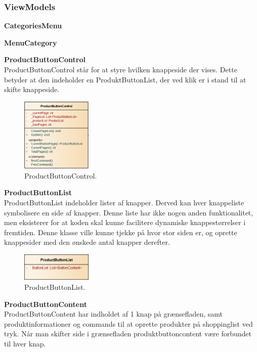 \subsubsection{ViewModels}
\textbf{CategoriesMenu}


\textbf{MenuCategory}

\textbf{ProductButtonControl} \\
ProductButtonControl står for at styre hvilken knappeside der vises. Dette betyder at den indeholder en ProduktButtonList, der ved klik er i stand til at skifte knappeside.

\begin{figure}[H]
	\centering
	\includegraphics[width=0.3\textwidth]{Systemdesign/Frontend/pics/ProductButtonControl}
	\caption{ProductButtonControl.}
	\label{fig:PBC}
\end{figure}

\textbf{ProductButtonList} \\
ProductButtonList indeholder lister af knapper. Derved kan hver knappeliste symbolisere en side af knapper. Denne liste har ikke nogen anden funktionalitet, men eksisterer for at koden skal kunne facilitere dynamiske knappestørrelser i fremtiden. Denne klasse ville kunne tjekke på hvor stor siden er, og oprette knappesider med den ønskede antal knapper derefter.


\begin{figure}[H]
	\centering
	\includegraphics[width=0.3\textwidth]{Systemdesign/Frontend/pics/ProductButtonList}
	\caption{ProductButtonList.}
	\label{fig:PBL}
\end{figure}

\textbf{ProductButtonContent} \\
ProductButtonContent har indholdet af 1 knap på grænsefladen, samt produktinformationer og commands til at oprette produkter på shoppinglist ved tryk. Når man skifter side i grænsefladen produktbuttoncontent være forbundet til hver knap.

